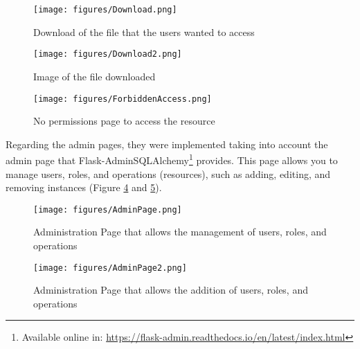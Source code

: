 \documentclass[10pt]{article}
\begin{document}
\begin{center}
    \begin{figure}[H]
        \centering
        \texttt{[image: figures/Download.png]}
            \caption{Download of the file that the users wanted to access}
        \label{fig:download}
    \end{figure}
\end{center}

\begin{center}
    \begin{figure}[H]
        \centering
        \texttt{[image: figures/Download2.png]}
            \caption{Image of the file downloaded}
        \label{fig:download1}
    \end{figure}
\end{center}

\begin{center}
    \begin{figure}[H]
        \centering
        \texttt{[image: figures/ForbiddenAccess.png]}
            \caption{No permissions page to access the resource}
        \label{fig:noPermissionPage}
    \end{figure}
\end{center}

Regarding the admin pages, they were implemented taking into account the admin page that Flask-AdminSQLAlchemy\footnote{Available online in: \url{https://flask-admin.readthedocs.io/en/latest/index.html}} provides. This page allows you to manage users, roles, and operations (resources), such as adding, editing, and removing instances (Figure \ref{fig:administration1} and \ref{fig:administration2}).

\begin{center}
    \begin{figure}[H]
        \centering
        \texttt{[image: figures/AdminPage.png]}
            \caption{Administration Page that allows the management of users, roles, and operations}
        \label{fig:administration1}
    \end{figure}
\end{center}

\begin{center}
    \begin{figure}[H]
        \centering
        \texttt{[image: figures/AdminPage2.png]}
            \caption{Administration Page that allows the addition of users, roles, and operations}
        \label{fig:administration2}
    \end{figure}
\end{center}
\end{document}
